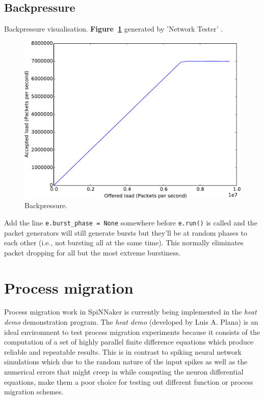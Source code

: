 \documentclass[a4paper, 11pt]{article}
\newlength\drop
\begin{document}
\clearpage
\subsection{Backpressure}
Backpressure visualisation. \textbf{Figure~\ref{fig:backpressure}} generated by 'Network Tester' \citep[see][]{heathcote2015networktester}.
\begin{figure}[htbp]
	\centering
	\includegraphics[width=0.5\linewidth]{images/backpressure2.pdf}
	\caption{Backpressure.}	
	\label{fig:backpressure}
\end{figure}

Add the line \verb|e.burst_phase = None| somewhere before \verb|e.run()| is called and the packet generators will still generate bursts but they'll be at random phases to each other (i.e., not bursting all at the same time). This normally eliminates packet dropping for all but the most extreme burstiness.

\clearpage
\section{Process migration}
\label{sec:migration}

Process migration work in SpiNNaker is currently being implemented in the \emph{heat demo} demonstration program. The \emph{heat demo} (developed by Luis A. Plana) is an ideal environment to test process migration experiments because it consists of the computation of a set of highly parallel finite difference equations which produce reliable and repeatable results. This is in contrast to spiking neural network simulations which due to the random nature of the input spikes as well as the numerical errors that might creep in while computing the neuron differential equations, make them a poor choice for testing out different function or process migration schemes. 
\end{document}
